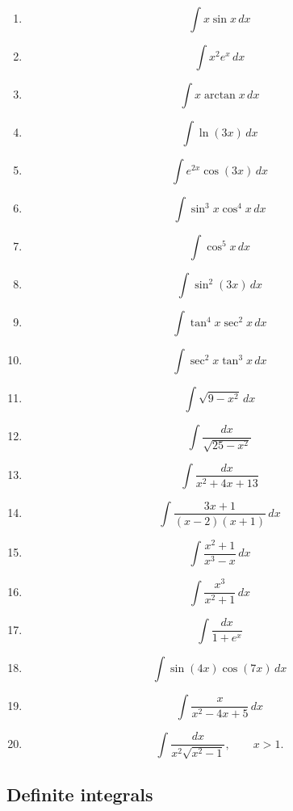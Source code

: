 \begin{enumerate}
\item
\[
\int x\sin x\,dx
\]

\item
\[
\int x^2e^x\,dx
\]

\item
\[
\int x\arctan x\,dx
\]

\item
\[
\int \ln(3x)\,dx
\]

\item
\[
\int e^{2x}\cos(3x)\,dx
\]

\item
\[
\int \sin^3x\cos^4x\,dx
\]

\item
\[
\int \cos^5x\,dx
\]

\item
\[
\int \sin^2(3x)\,dx
\]

\item
\[
\int \tan^4x\sec^2x\,dx
\]

\item
\[
\int \sec^2x\tan^3x\,dx
\]

\item
\[
\int \sqrt{9-x^2}\,dx
\]

\item
\[
\int \frac{dx}{\sqrt{25-x^2}}
\]

\item
\[
\int \frac{dx}{x^2+4x+13}
\]

\item
\[
\int \frac{3x+1}{(x-2)(x+1)}\,dx
\]

\item
\[
\int \frac{x^2+1}{x^3-x}\,dx
\]

\item
\[
\int \frac{x^3}{x^2+1}\,dx
\]

\item
\[
\int \frac{dx}{1+e^x}
\]

\item
\[
\int \sin(4x)\cos(7x)\,dx
\]

\item
\[
\int \frac{x}{x^2-4x+5}\,dx
\]

\item
\[
\int \frac{dx}{x^2\sqrt{x^2-1}},
\qquad x>1.
\]
\end{enumerate}

\subsection{Definite integrals}
\label{subsec:chapter-11-definite-integrals}

